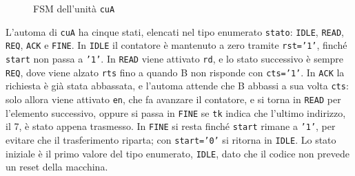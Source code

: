 \begin{figure}[htbp]
  \centering
  \caption{FSM dell'unità \texttt{cuA}}
  \label{fig:esercizio12-1:fsm-a}
\end{figure}

L'automa di \texttt{cuA} ha cinque stati, elencati nel tipo enumerato \texttt{stato}: \texttt{IDLE}, \texttt{READ}, \texttt{REQ}, \texttt{ACK} e \texttt{FINE}. In \texttt{IDLE} il contatore è mantenuto a zero tramite \texttt{rst=}\texttt{'1'}, finché \texttt{start} non passa a \texttt{'1'}. In \texttt{READ} viene attivato \texttt{rd}, e lo stato successivo è sempre \texttt{REQ}, dove viene alzato \texttt{rts} fino a quando B non risponde con \texttt{cts=}\texttt{'1'}. In \texttt{ACK} la richiesta è già stata abbassata, e l'automa attende che B abbassi a sua volta \texttt{cts}: solo allora viene attivato \texttt{en}, che fa avanzare il contatore, e si torna in \texttt{READ} per l'elemento successivo, oppure si passa in \texttt{FINE} se \texttt{tk} indica che l'ultimo indirizzo, il 7, è stato appena trasmesso. In \texttt{FINE} si resta finché \texttt{start} rimane a \texttt{'1'}, per evitare che il trasferimento riparta; con \texttt{start=}\texttt{'0'} si ritorna in \texttt{IDLE}. Lo stato iniziale è il primo valore del tipo enumerato, \texttt{IDLE}, dato che il codice non prevede un reset della macchina.

